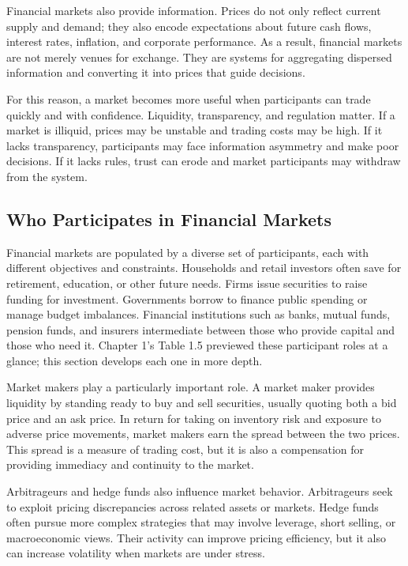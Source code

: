 \documentclass[../ai_in_finance]{subfiles}
\begin{document}
Financial markets also provide information. Prices do not only reflect current supply and demand; they also encode expectations about future cash flows, interest rates, inflation, and corporate performance. As a result, financial markets are not merely venues for exchange. They are systems for aggregating dispersed information and converting it into prices that guide decisions.

For this reason, a market becomes more useful when participants can trade quickly and with confidence. Liquidity, transparency, and regulation matter. If a market is illiquid, prices may be unstable and trading costs may be high. If it lacks transparency, participants may face information asymmetry and make poor decisions. If it lacks rules, trust can erode and market participants may withdraw from the system.

\subsection{Who Participates in Financial Markets}

Financial markets are populated by a diverse set of participants, each with different objectives and constraints. Households and retail investors often save for retirement, education, or other future needs. Firms issue securities to raise funding for investment. Governments borrow to finance public spending or manage budget imbalances. Financial institutions such as banks, mutual funds, pension funds, and insurers intermediate between those who provide capital and those who need it. Chapter 1's Table 1.5 previewed these participant roles at a glance; this section develops each one in more depth.

Market makers play a particularly important role. A market maker provides liquidity by standing ready to buy and sell securities, usually quoting both a bid price and an ask price. In return for taking on inventory risk and exposure to adverse price movements, market makers earn the spread between the two prices. This spread is a measure of trading cost, but it is also a compensation for providing immediacy and continuity to the market.

Arbitrageurs and hedge funds also influence market behavior. Arbitrageurs seek to exploit pricing discrepancies across related assets or markets. Hedge funds often pursue more complex strategies that may involve leverage, short selling, or macroeconomic views. Their activity can improve pricing efficiency, but it also can increase volatility when markets are under stress.
\end{document}
